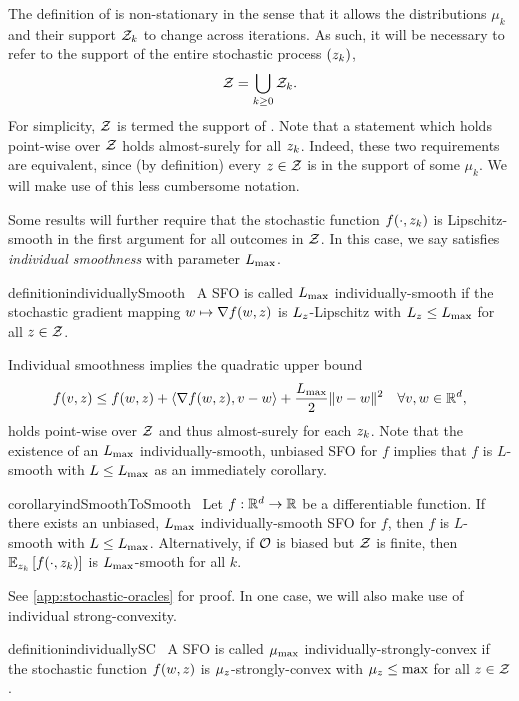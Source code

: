 The definition of \oracle{} is non-stationary in the sense that it allows the distributions \( \mu_k \) and their support \( \calZ_k \) to change across iterations.
As such, it will be necessary to refer to the support of the entire stochastic process \( \seq{\zk} \), 
\[ \calZ = \bigcup_{k\geq 0} \calZ_k. \]
For simplicity, \( \calZ \) is termed the support of \oracle{}. 
Note that a statement which holds point-wise over \( \calZ \) holds almost-surely for all \( \zk \).
Indeed, these two requirements are equivalent, since (by definition) every \( \z \in \calZ \) is in the support of some \( \mu_k \).
We will make use of this less cumbersome notation. 

Some results will further require that the stochastic function \( f(\cdot, \zk) \) is Lipschitz-smooth in the first argument for all outcomes in \( \calZ \).
In this case, we say \oracle{} satisfies \emph{individual smoothness} with parameter \( \Lmax \).
\begin{restatable}{definition}{individuallySmooth}~\label{def:individually-smooth}
    A \ac{SFO} \oracle{} is called \( \Lmax \) individually-smooth if the stochastic gradient mapping \( \w \mapsto \grad(\w, \z) \) is \( L_{\z} \)-Lipschitz with \( L_{\z} \leq \Lmax \) for all \( \z \in \calZ \).
\end{restatable}
Individual smoothness implies the quadratic upper bound
\[ f(v, \z) \leq f(\w, \z) + \abr{\grad(\w, \z), v - \w} + \frac{\Lmax}{2}\norm{v - \w}^2 \quad \forall v, \w \in \R^d, \]
holds point-wise over \( \calZ \) and thus almost-surely for each \( \zk \).
Note that the existence of an \( \Lmax \) individually-smooth, unbiased \ac{SFO} for \( f \) implies that \( f \) is \( L \)-smooth with \( L \leq \Lmax \) as an immediately corollary.
\begin{restatable}{corollary}{indSmoothToSmooth}~\label{cor:ind-smooth-to-smooth}
    Let \( f : \R^d \rightarrow \R \) be a differentiable function.  
    If there exists an unbiased, \( \Lmax \) individually-smooth \ac{SFO} \oracle{} for \( f \), then \( f \) is \( L \)-smooth with \( L \leq \Lmax \).
    Alternatively, if \( \oracle{} \) is biased but \( \calZ \) is finite, then \( \Ek \sbr{f(\cdot, \zk)} \) is \( \Lmax \)-smooth for all \( k \). 
\end{restatable}
See \autoref{app:stochastic-oracles} for proof. 
In one case, we will also make use of individual strong-convexity.
\begin{restatable}{definition}{individuallySC}~\label{def:individually-sc}
    A \ac{SFO} \oracle{} is called \( \mumax \) individually-strongly-convex if the stochastic function \( f(\w, \z) \) is \( \mu_{\z} \)-strongly-convex with \( \mu_{\z} \leq \max \) for all \( \z \in \calZ \).
\end{restatable}

